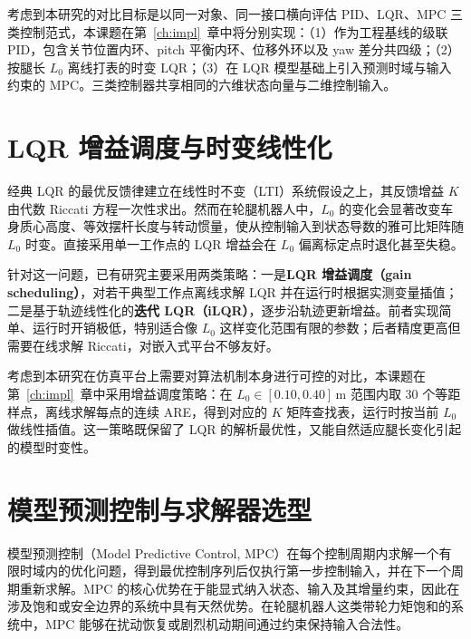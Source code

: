 \documentclass{smbuthesis}
\begin{document}
考虑到本研究的对比目标是以同一对象、同一接口横向评估 PID、LQR、MPC 三类控制范式，本课题在第~\ref{ch:impl}~章中将分别实现：（1）作为工程基线的级联 PID，包含关节位置内环、pitch 平衡内环、位移外环以及 yaw 差分共四级；（2）按腿长 $L_0$ 离线打表的时变 LQR；（3）在 LQR 模型基础上引入预测时域与输入约束的 MPC。三类控制器共享相同的六维状态向量与二维控制输入。

\section{LQR 增益调度与时变线性化}

经典 LQR 的最优反馈律建立在线性时不变（LTI）系统假设之上，其反馈增益 $K$ 由代数 Riccati 方程一次性求出\cite{AndersonMoore1990OptControl,KwakernaakSivan1972LinearOpt}。然而在轮腿机器人中，$L_0$ 的变化会显著改变车身质心高度、等效摆杆长度与转动惯量，使从控制输入到状态导数的雅可比矩阵随 $L_0$ 时变。直接采用单一工作点的 LQR 增益会在 $L_0$ 偏离标定点时退化甚至失稳\cite{Wang2021WheelLegged,Klemm2020LQRWBC}。

针对这一问题，已有研究主要采用两类策略：一是\textbf{LQR 增益调度（gain scheduling）}\cite{RughShamma2000GainSched}，对若干典型工作点离线求解 LQR 并在运行时根据实测变量插值；二是基于轨迹线性化的\textbf{迭代 LQR（iLQR）}\cite{Tassa2012iLQR}，逐步沿轨迹更新增益。前者实现简单、运行时开销极低，特别适合像 $L_0$ 这样变化范围有限的参数；后者精度更高但需要在线求解 Riccati，对嵌入式平台不够友好。

考虑到本研究在仿真平台上需要对算法机制本身进行可控的对比，本课题在第~\ref{ch:impl}~章中采用增益调度策略：在 $L_0 \in [0.10, 0.40]\,\mathrm{m}$ 范围内取 30 个等距样点，离线求解每点的连续 ARE，得到对应的 $K$ 矩阵查找表，运行时按当前 $L_0$ 做线性插值。这一策略既保留了 LQR 的解析最优性，又能自然适应腿长变化引起的模型时变性。

\section{模型预测控制与求解器选型}

模型预测控制（Model Predictive Control, MPC）在每个控制周期内求解一个有限时域内的优化问题，得到最优控制序列后仅执行第一步控制输入，并在下一个周期重新求解\cite{Mayne2000ConstrainedMPC,Maciejowski2002Predictive}。MPC 的核心优势在于能显式纳入状态、输入及其增量约束，因此在涉及饱和或安全边界的系统中具有天然优势。在轮腿机器人这类带轮力矩饱和的系统中，MPC 能够在扰动恢复或剧烈机动期间通过约束保持输入合法性。
\end{document}
